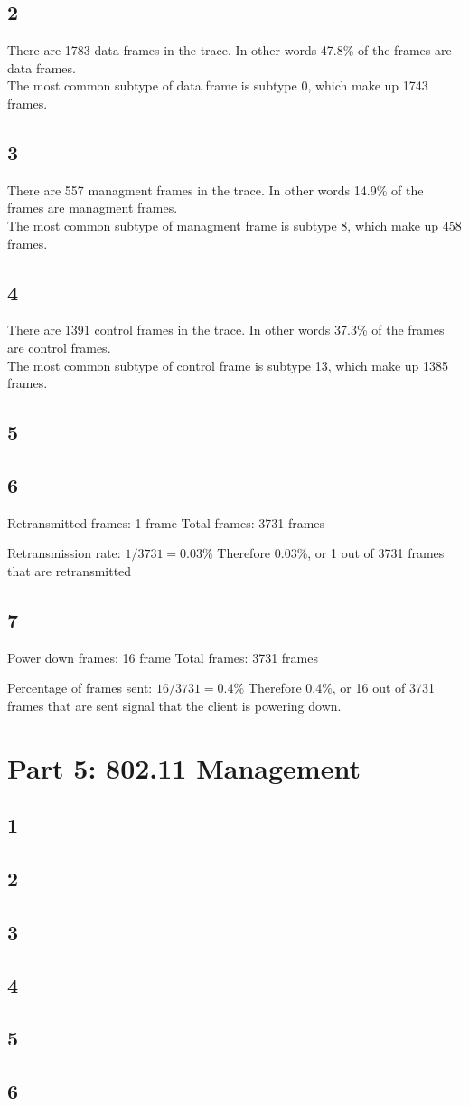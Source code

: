 \documentclass{article}
\begin{document}
    \subsection*{2}
    There are 1783 data frames in the trace. In other words 47.8\% of the frames are data frames.\\
    The most common subtype of data frame is subtype 0, which make up 1743 frames.
    \subsection*{3}
    There are 557 managment frames in the trace. In other words 14.9\% of the frames are managment frames.\\
    The most common subtype of managment frame is subtype 8, which make up 458 frames.
    \subsection*{4}
    There are 1391 control frames in the trace. In other words 37.3\% of the frames are control frames.\\
    The most common subtype of control frame is subtype 13, which make up 1385 frames.
    \subsection*{5}
    \subsection*{6}
    Retransmitted frames: 1 frame
    Total frames: 3731 frames

    Retransmission rate: $1 / 3731 = 0.03\%$
    Therefore 0.03\%, or 1 out of 3731 frames that are retransmitted
    \subsection*{7}
    Power down frames: 16 frame
    Total frames: 3731 frames

    Percentage of frames sent: $16 / 3731 = 0.4\%$
    Therefore 0.4\%, or 16 out of 3731 frames that are sent signal that the client is powering down.
    \section*{Part 5: 802.11 Management}
    \subsection*{1}
    \subsection*{2}
    \subsection*{3}
    \subsection*{4}
    \subsection*{5}
    \subsection*{6}
\end{document}
